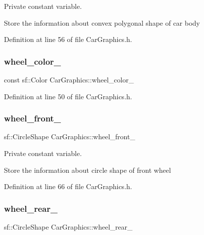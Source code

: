 Private constant variable. 

Store the information about convex polygonal shape of car body 

Definition at line 56 of file Car\+Graphics.\+h.

\mbox{\label{classCarGraphics_adc369f5f948025767d40f2ad40e2568a}} 
\subsubsection{\texorpdfstring{wheel\+\_\+color\+\_\+}{wheel\_color\_}}
{\footnotesize\ttfamily const sf\+::\+Color Car\+Graphics\+::wheel\+\_\+color\+\_\+\hspace{0.3cm}{\ttfamily [private]}}



Definition at line 50 of file Car\+Graphics.\+h.

\mbox{\label{classCarGraphics_a2e004e7f0288f6ed1352ba9116b4d112}} 
\subsubsection{\texorpdfstring{wheel\+\_\+front\+\_\+}{wheel\_front\_}}
{\footnotesize\ttfamily sf\+::\+Circle\+Shape Car\+Graphics\+::wheel\+\_\+front\+\_\+\hspace{0.3cm}{\ttfamily [private]}}



Private constant variable. 

Store the information about circle shape of front wheel 

Definition at line 66 of file Car\+Graphics.\+h.

\mbox{\label{classCarGraphics_a2a66d0c60b79f54a807a31afd76c4ad1}} 
\subsubsection{\texorpdfstring{wheel\+\_\+rear\+\_\+}{wheel\_rear\_}}
{\footnotesize\ttfamily sf\+::\+Circle\+Shape Car\+Graphics\+::wheel\+\_\+rear\+\_\+\hspace{0.3cm}{\ttfamily [private]}}



